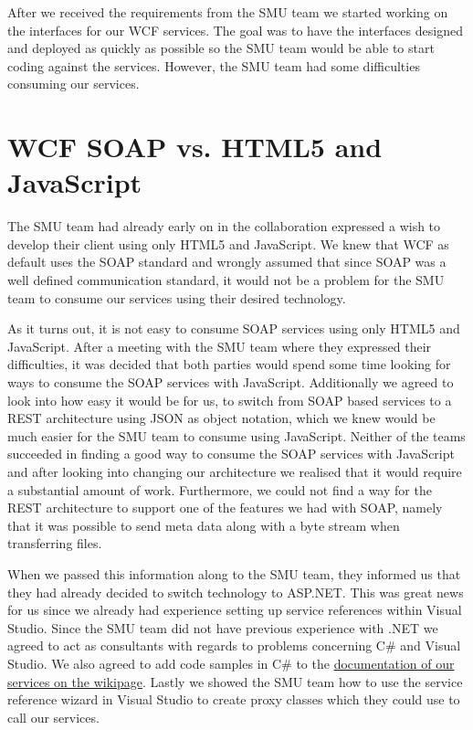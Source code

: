 \documentclass[../report.tex]{subfiles}
\begin{document}
After we received the requirements from the SMU team we started working on the interfaces for our WCF services. 
The goal was to have the interfaces designed and deployed as quickly as possible so the SMU team would be able to start coding against the services.
However, the SMU team had some difficulties consuming our services.
\section{WCF SOAP vs. HTML5 and JavaScript}
The SMU team had already early on in the collaboration expressed a wish to develop their client using only HTML5 and JavaScript. 
We knew that WCF as default uses the SOAP standard and wrongly assumed that since SOAP was a well defined communication standard, it would not be a problem for the SMU team to consume our services using their desired technology.

As it turns out, it is not easy to consume SOAP services using only HTML5 and JavaScript.
After a meeting with the SMU team where they expressed their difficulties, it was decided that both parties would spend some time looking for ways to consume the SOAP services with JavaScript.
Additionally we agreed to look into how easy it would be for us, to switch from SOAP based services to a REST architecture using JSON as object notation, which we knew would be much easier for the SMU team to consume using JavaScript.
Neither of the teams succeeded in finding a good way to consume the SOAP services with JavaScript and after looking into changing our architecture we realised that it would require a substantial amount of work.
Furthermore, we could not find a way for the REST architecture to support one of the features we had with SOAP, namely that it was possible to send meta data along with a byte stream when transferring files.

When we passed this information along to the SMU team, they informed us that they had already decided to switch technology to ASP.NET.
This was great news for us since we already had experience setting up service references within Visual Studio.
Since the SMU team did not have previous experience with .NET we agreed to act as consultants with regards to problems concerning C\# and Visual Studio.
We also agreed to add code samples in C\# to the \href{https://wiki.smu.edu.sg/is411/Team8\_Services\_Documentation}{documentation of our services on the wikipage}\cite{SMU-Wiki-2}.
Lastly we showed the SMU team how to use the service reference wizard in Visual Studio to create proxy classes which they could use to call our services.
\end{document}

